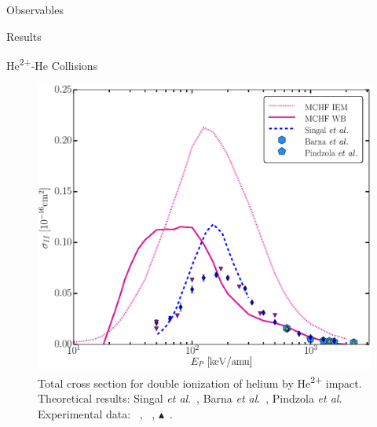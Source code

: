 \documentclass[letterpaper, 11 pt]{report}
\begin{document}
\begin{chapter}{Observables \label{chap:p-he2p-he}}
\begin{section}{Results \label{sec:phe2p-res}}
\begin{subsection}{\texorpdfstring{He\textsuperscript{2+}}{He2+}-He Collisions 
                         \label{sec:he2phe-res}}
\begin{figure}[ht]
\begin{minipage}{.49\linewidth}
               \centering
               \includegraphics[width = \linewidth]{./images/he2phe/he2phe-II.eps}
               \caption[Total cross section for double ionization of helium by He\textsuperscript{2+}
                        impact.]{Total cross section for double ionization of helium by
                        He\textsuperscript{2+} impact. Theoretical results: Singal
                        \textit{et al}.~\cite{SL-91}, Barna
                        \textit{et al}.~\cite{BTB-05}, Pindzola \textit{et al}.~\cite{PRC-07}
                        Experimental data: {\color{blue}{$\blacklozenge$}}~\cite{SG85},
                        {\color{RedViolet}{$\blacktriangledown$}}~\cite{Dubois87},
                        {\color{GreenYellow}$\blacktriangle$}~\cite{KAH84}. \label{fig:he2phe-ii}}
            \end{minipage}
         \end{figure}

         \begin{figure}[ht]
            \begin{minipage}{.49\linewidth}
               

\end{minipage}
\end{figure}
\end{subsection}
\end{section}
\end{chapter}
\end{document}
